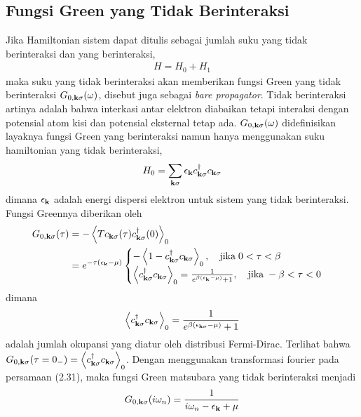 \subsection{Fungsi Green yang Tidak Berinteraksi}
Jika Hamiltonian sistem dapat ditulis sebagai jumlah suku yang tidak berinteraksi dan yang berinteraksi,
\begin{align}
H = H_0 + H_1
\end{align}
maka suku yang tidak berinteraksi akan memberikan fungsi Green yang tidak berinteraksi $G_{0,\textbf{k}\sigma}(\omega)$, disebut juga sebagai \textit{bare propagator}. Tidak berinteraksi artinya adalah bahwa interkasi antar elektron diabaikan tetapi interaksi dengan potensial atom kisi dan potensial eksternal tetap ada. $G_{0,\textbf{k}\sigma}(\omega)$ didefinisikan layaknya fungsi Green yang berinteraksi namun hanya menggunakan suku hamiltonian yang tidak berinteraksi,
\begin{align}
H_0 = \sum_{\textbf{k}\sigma} \epsilon_{\textbf{k}} c^\dagger_{\textbf{k}\sigma} c_{\textbf{k}\sigma}
\end{align}
dimana $\epsilon_{\textbf{k}}$ adalah energi dispersi elektron untuk sistem yang tidak berinteraksi. Fungsi Greennya diberikan oleh
\begin{align}
G_{0,\textbf{k}\sigma}(\tau) &= - \left\langle T c_{\textbf{k}\sigma}(\tau)c^\dagger_{\textbf{k}\sigma}(0)\right\rangle_0 \notag\\
&= e^{-\tau(\epsilon_{\textbf{k}} - \mu)}
\begin{cases}
-\left\langle 1 - c^\dagger_{\textbf{k}\sigma}c_{\textbf{k}\sigma} \right\rangle_0, \quad \text{jika} \; 0 < \tau < \beta\\
\left\langle c^\dagger_{\textbf{k}\sigma}c_{\textbf{k}\sigma} \right\rangle_0 = \frac{1}{e^{\beta(\epsilon_{\textbf{k}} - \mu)} + 1}, \quad \text{jika} \; -\beta < \tau < 0
\end{cases}
\end{align}
dimana 
\begin{align}
\left\langle c^\dagger_{\textbf{k}\sigma}c_{\textbf{k}\sigma} \right\rangle_0 = \frac{1}{e^{\beta(\epsilon_{\textbf{k}\sigma} - \mu)} + 1}
\end{align}
adalah jumlah okupansi yang diatur oleh distribusi Fermi-Dirac. Terlihat bahwa $G_{0,\textbf{k}\sigma}(\tau = 0_-) = \left\langle c^\dagger_{\textbf{k}\sigma} c_{\textbf{k}\sigma} \right\rangle_0$. Dengan menggunakan transformasi fourier pada persamaan (2.31), maka fungsi Green matsubara yang tidak berinteraksi menjadi 
\begin{align}
G_{0,\textbf{k}\sigma}(i\omega_n) = \frac{1}{i\omega_n - \epsilon_{\textbf{k}} + \mu}
\end{align}
